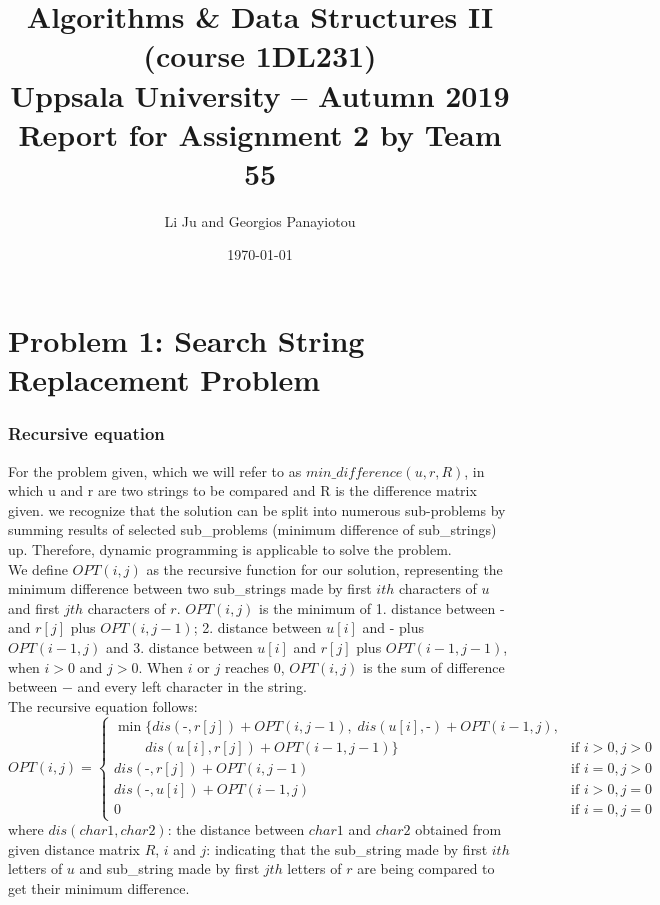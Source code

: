 \documentclass[a4paper,11pt]{article}
\title{\textbf{Algorithms \& Data Structures II (course 1DL231) \\
    Uppsala University -- Autumn 2019 \\
    Report for Assignment 2
    by Team 55}}
\author{Li Ju and Georgios Panayiotou}
\date{\today}
\begin{document}
\maketitle

\part{Problem 1: Search String Replacement Problem}
\section{Recursive equation}

For the problem given, which we will refer to as $min\_difference(u, r, R)$, in which u and r are two strings to be compared and R is the difference matrix given. we recognize that the solution can be split into numerous sub-problems by summing results of selected sub\_problems (minimum difference of sub\_strings) up. Therefore, dynamic programming is applicable to solve the problem.\\

We define $OPT(i,j)$ as the recursive function for our solution, representing the minimum difference between two sub\_strings made by first $ith$ characters of $u$ and first $jth$ characters of $r$. $OPT(i,j)$ is the minimum of 1. distance between $\mbox{-}$ and $r[j]$ plus $OPT(i, j-1)$; 2. distance between $u[i]$ and $\mbox{-}$ plus $OPT(i-1, j)$ and 3. distance between $u[i]$ and $r[j]$ plus $OPT(i-1, j-1)$, when $i>0$ and $j>0$. When $i$ or $j$ reaches $0$, $OPT(i, j)$ is the sum of difference between $-$ and every left character in the string. \\

The recursive equation follows: 
$$OPT(i,j)=
    \begin{cases}
    \min \{dis(\mbox{-}, r[j])+OPT(i, j-1), \; dis(u[i], \mbox{-})+OPT(i-1, j), \\
    \; \; \; \; \; \; \; \; dis(u[i], r[j])+OPT(i-1, j-1) \} & \text{if~} i>0, j>0\\
    dis(\mbox{-}, r[j])+OPT(i, j-1) & \text{if~} i=0, j>0\\
    dis(\mbox{-}, u[i])+OPT(i-1, j) & \text{if~} i>0, j=0\\
    0 & \text{if~} i=0, j=0
    \end{cases}$$
where $dis(char1, char2)$: the distance between $char1$ and $char2$ obtained from given distance matrix $R$, $i$ and $j$: indicating that the sub\_string made by first $ith$ letters of $u$ and sub\_string made by first $jth$ letters of $r$ are being compared to get their minimum difference.\\
\end{document}

